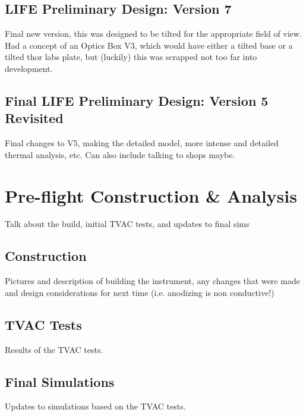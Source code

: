 \subsection{LIFE Preliminary Design: Version 7}
Final new version, this was designed to be tilted for the appropriate field of view. Had a concept of an Optics Box V3, which would have either a tilted base or a tilted thor labs plate, but (luckily) this was scrapped not too far into development.

\subsection{Final LIFE Preliminary Design: Version 5 Revisited}
Final changes to V5, making the detailed model, more intense and detailed thermal analysis, etc. Can also include talking to shops maybe.

\section{Pre-flight Construction \& Analysis}\label{preflight_const_analysis}
Talk about the build, initial TVAC tests, and updates to final sims

\subsection{Construction}
Pictures and description of building the instrument, any changes that were made and design considerations for next time (i.e. anodizing is non conductive!)

\subsection{TVAC Tests}\label{TVAC_tests}
Results of the TVAC tests.

\subsection{Final Simulations}
Updates to simulations based on the TVAC tests.